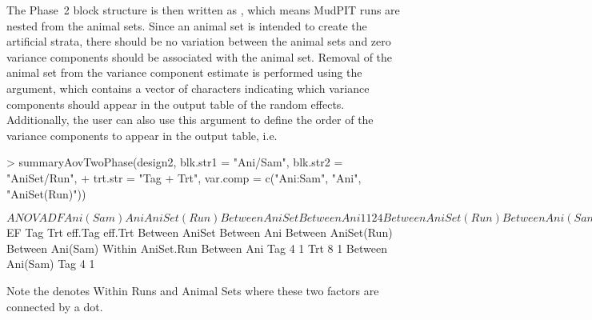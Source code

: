 \documentclass[article]{jss}
\begin{document}
The Phase~2 block structure is then written as , which means MudPIT runs are nested from the animal sets. Since an animal set is intended to create the artificial strata, there should be no variation between the animal sets and zero variance components should be associated with the animal set. Removal of the animal set from the variance component estimate is performed using the  argument, which contains a vector of characters indicating which variance components should appear in the output table of the random effects. Additionally, the user can also use this argument to define the order of the variance components to appear in the output table, i.e.
\begin{CodeChunk}
\begin{CodeInput}
> summaryAovTwoPhase(design2, blk.str1 = "Ani/Sam", blk.str2 = "AniSet/Run", 
+	trt.str = "Tag + Trt", var.comp = c("Ani:Sam", "Ani", "AniSet(Run)"))                                    
\end{CodeInput}
\begin{CodeOutput}
$ANOVA
                    DF Ani(Sam) Ani AniSet(Run)
Between AniSet                                 
   Between Ani      1  1        2   4          
Between AniSet(Run)                            
   Between Ani(Sam) 2  1        0   4          
Within AniSet.Run                              
   Between Ani                                 
      Tag           1  1        2   0          
      Trt           1  1        2   0          
      Residual      4  1        2   0          
   Between Ani(Sam)                            
      Tag           2  1        0   0          
      Residual      4  1        0   0          

$EF
                    Tag Trt eff.Tag eff.Trt
Between AniSet                             
   Between Ani                             
Between AniSet(Run)                        
   Between Ani(Sam)                        
Within AniSet.Run                          
   Between Ani                             
      Tag           4       1              
      Trt               8           1      
   Between Ani(Sam)                        
      Tag           4       1                          
\end{CodeOutput}
\end{CodeChunk}
Note the  denotes Within Runs and Animal Sets where these two factors are connected by a dot.  
\end{document}
